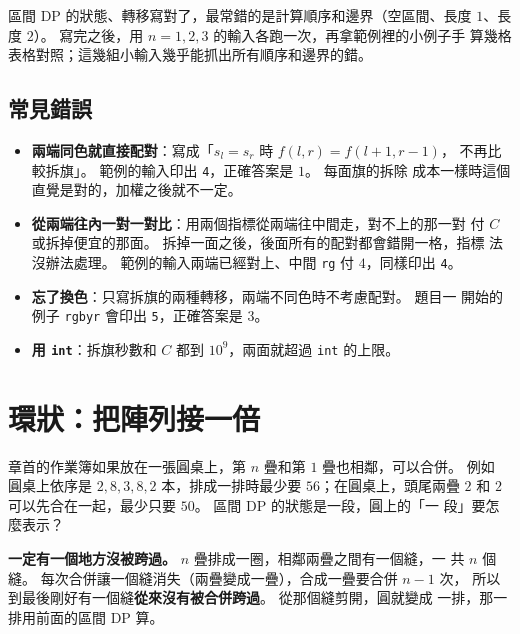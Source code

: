 \begin{apcsnote}
區間 DP 的狀態、轉移寫對了，最常錯的是計算順序和邊界（空區間、長度 $1$、長
度 $2$）。 寫完之後，用 $n = 1, 2, 3$ 的輸入各跑一次，再拿範例裡的小例子手
算幾格表格對照；這幾組小輸入幾乎能抓出所有順序和邊界的錯。
\end{apcsnote}

\subsection{常見錯誤}

\begin{itemize}
\item \textbf{兩端同色就直接配對}：寫成「$s_l = s_r$ 時 $f(l, r) = f(l + 1, r - 1)$，
不再比較拆旗」。 範例的輸入印出 \texttt{4}，正確答案是 $1$。 每面旗的拆除
成本一樣時這個直覺是對的，加權之後就不一定。
\item \textbf{從兩端往內一對一對比}：用兩個指標從兩端往中間走，對不上的那一對
付 $C$ 或拆掉便宜的那面。 拆掉一面之後，後面所有的配對都會錯開一格，指標
法沒辦法處理。 範例的輸入兩端已經對上、中間 \texttt{rg} 付 $4$，同樣印出
\texttt{4}。
\item \textbf{忘了換色}：只寫拆旗的兩種轉移，兩端不同色時不考慮配對。 題目一
開始的例子 \texttt{rgbyr} 會印出 \texttt{5}，正確答案是 $3$。
\item \textbf{用 \texttt{int}}：拆旗秒數和 $C$ 都到 $10^9$，兩面就超過
\texttt{int} 的上限。
\end{itemize}

\section{環狀：把陣列接一倍}
\label{sec:ivdp-ring}

章首的作業簿如果放在一張圓桌上，第 $n$ 疊和第 $1$ 疊也相鄰，可以合併。 例如
圓桌上依序是 $2, 8, 3, 8, 2$ 本，排成一排時最少要 $56$；在圓桌上，頭尾兩疊
$2$ 和 $2$ 可以先合在一起，最少只要 $50$。 區間 DP 的狀態是一段，圓上的「一
段」要怎麼表示？

\textbf{一定有一個地方沒被跨過。} $n$ 疊排成一圈，相鄰兩疊之間有一個縫，一
共 $n$ 個縫。 每次合併讓一個縫消失（兩疊變成一疊），合成一疊要合併 $n - 1$ 次，
所以到最後剛好有一個縫\textbf{從來沒有被合併跨過}。 從那個縫剪開，圓就變成
一排，那一排用前面的區間 DP 算。

